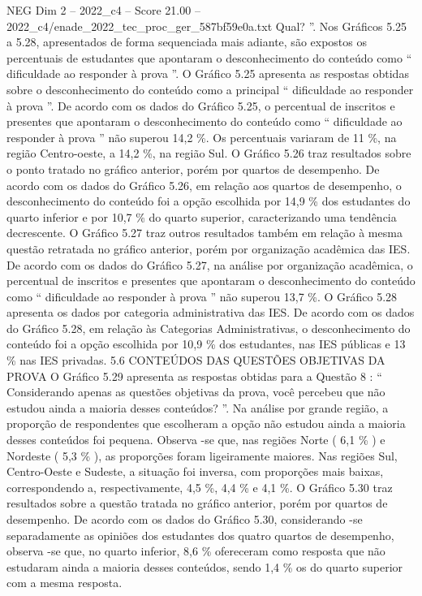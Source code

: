 \begin{textsample}{NEG Dim 2 – 2022\_c4 – Score 21.00 – 2022\_c4/enade\_2022\_tec\_proc\_ger\_587bf59e0a.txt}
Qual? ”.
Nos Gráficos 5.25 a 5.28, apresentados de forma sequenciada mais adiante, são expostos os percentuais de estudantes que apontaram o desconhecimento do conteúdo como “ dificuldade ao responder à prova ”.
O Gráfico 5.25 apresenta as respostas obtidas sobre o desconhecimento do conteúdo como a principal “ dificuldade ao responder à prova ”.
De acordo com os dados do Gráfico 5.25, o percentual de inscritos e presentes que apontaram o desconhecimento do conteúdo como “ dificuldade ao responder à prova ” não superou 14,2 \%.
Os percentuais variaram de 11 \%, na região Centro-oeste, a 14,2 \%, na região Sul.
O Gráfico 5.26 traz resultados sobre o ponto tratado no gráfico anterior, porém por quartos de desempenho.
De acordo com os dados do Gráfico 5.26, em relação aos quartos de desempenho, o desconhecimento do conteúdo foi a opção escolhida por 14,9 \% dos estudantes do quarto inferior e por 10,7 \% do quarto superior, caracterizando uma tendência decrescente.
O Gráfico 5.27 traz outros resultados também em relação à mesma questão retratada no gráfico anterior, porém por organização acadêmica das IES.
De acordo com os dados do Gráfico 5.27, na análise por organização acadêmica, o percentual de inscritos e presentes que apontaram o desconhecimento do conteúdo como “ dificuldade ao responder à prova ” não superou 13,7 \%.
O Gráfico 5.28 apresenta os dados por categoria administrativa das IES.
De acordo com os dados do Gráfico 5.28, em relação às Categorias Administrativas, o desconhecimento do conteúdo foi a opção escolhida por 10,9 \% dos estudantes, nas IES públicas e 13 \% nas IES privadas. 5.6 CONTEÚDOS DAS QUESTÕES OBJETIVAS DA PROVA O Gráfico 5.29 apresenta as respostas obtidas para a Questão 8 : “ Considerando apenas as questões objetivas da prova, você percebeu que não estudou ainda a maioria desses conteúdos? ”.
Na análise por grande região, a proporção de respondentes que escolheram a opção não estudou ainda a maioria desses conteúdos foi pequena.
Observa -se que, nas regiões Norte ( 6,1 \% ) e Nordeste ( 5,3 \% ), as proporções foram ligeiramente maiores.
Nas regiões Sul, Centro-Oeste e Sudeste, a situação foi inversa, com proporções mais baixas, correspondendo a, respectivamente, 4,5 \%, 4,4 \% e 4,1 \%.
O Gráfico 5.30 traz resultados sobre a questão tratada no gráfico anterior, porém por quartos de desempenho.
De acordo com os dados do Gráfico 5.30, considerando -se separadamente as opiniões dos estudantes dos quatro quartos de desempenho, observa -se que, no quarto inferior, 8,6 \% ofereceram como resposta que não estudaram ainda a maioria desses conteúdos, sendo 1,4 \% os do quarto superior com a mesma resposta.

\end{textsample}
